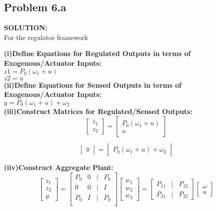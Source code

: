 \documentclass[10pt,a4paper]{article}
\begin{document}
\subsection{Problem 6.a}
\begin{tcolorbox}
\textbf{SOLUTION:}\\
For the regulator framework 

\textbf{(i)Define Equations for Regulated Outputs in terms of Exogenous/Actuator Inputs:} \\
$z1= P_0(\omega_1+u)$\\
$z2=u$\\

\textbf{(ii)Define Equations for Sensed Outputs in terms of Exogenous/Actuator Inputs:} \\
$y=P_0(\omega_1+u)+\omega_2$\\

\textbf{(iii)Construct Matrices for Regulated/Sensed Outputs:} \\
$$\begin{bmatrix}
z_1\\z_2
\end{bmatrix}=\begin{bmatrix}
P_0(\omega_1+u)\\u
\end{bmatrix}$$

$$\begin{bmatrix}
y
\end{bmatrix}=\begin{bmatrix}
P_0(\omega_1+u)+\omega_2
\end{bmatrix}$$

\textbf{(iiv)Construct Aggregate Plant:} \\
$$\begin{bmatrix}
z_1\\z_2\\y
\end{bmatrix}=\begin{bmatrix}
P_0& 0& |& P_0\\
0&	0&	|& I\\
\hline
P_0& I& |&P_0\\
\end{bmatrix}\begin{bmatrix}
w_1\\w_2\\w_3
\end{bmatrix}=\begin{bmatrix}
P_{11}& |& P_{12}\\
\hline
P_{21}& |&P_{22}
\end{bmatrix}\begin{bmatrix}
\omega\\u
\end{bmatrix}$$\\


\end{tcolorbox}
\end{document}
